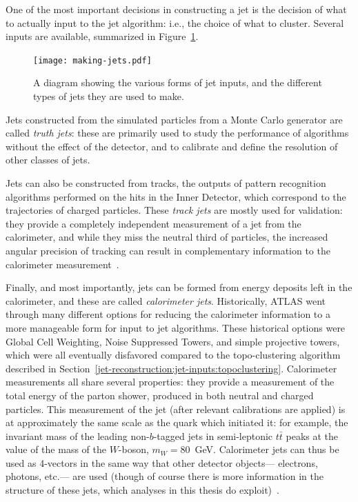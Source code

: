 One of the most important decisions in constructing a jet is the decision of what to actually input to the jet algorithm: i.e., the choice of what to cluster. Several inputs are available, summarized in Figure~\ref{fig:jet-reconstruction:making-jets}. 


\begin{figure}
\centering
\texttt{[image: making-jets.pdf]}
\label{fig:jet-reconstruction:making-jets}
\caption{A diagram showing the various forms of jet inputs, and the different types of jets they are used to make.}
\end{figure}


Jets constructed from the simulated particles from a Monte Carlo generator are called \textit{truth jets}: these are primarily used to study the performance of algorithms without the effect of the detector, and to calibrate and define the resolution of other classes of jets. 

Jets can also be constructed from tracks, the outputs of pattern recognition algorithms performed on the hits in the Inner Detector, which correspond to the trajectories of charged particles. These \textit{track jets} are mostly used for validation: they provide a completely independent measurement of a jet from the calorimeter, and while they miss the neutral third of particles, the increased angular precision of tracking can result in complementary information to the calorimeter measurement~\cite{Zenz:1374663,ATLAS-SS-2011}.

Finally, and most importantly, jets can be formed from energy deposits left in the calorimeter, and these are called \textit{calorimeter jets}. Historically, ATLAS went through many different options for reducing the calorimeter information to a more manageable form for input to jet algorithms. These historical options were Global Cell Weighting, Noise Suppressed Towers, and simple projective towers, which were all eventually disfavored compared to the topo-clustering algorithm described in Section~\ref{jet-reconstruction:jet-inputs:topoclustering}. Calorimeter measurements all share several properties: they provide a measurement of the total energy of the parton shower, produced in both neutral and charged particles. This measurement of the jet (after relevant calibrations are applied) is at approximately the same scale as the quark which initiated it: for example, the invariant mass of the leading non-$b$-tagged jets in semi-leptonic $t\bar{t}$ peaks at the value of the mass of the $W$-boson, $m_{W} = 80$~GeV. Calorimeter jets can thus be used as 4-vectors in the same way that other detector objects--- electrons, photons, etc.--- are used (though of course there is more information in the structure of these jets, which analyses in this thesis do exploit)~\cite{JES2010,Aad:2012vm}. 


